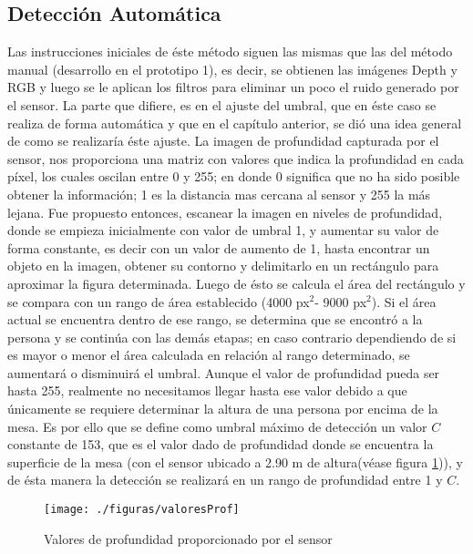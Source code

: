 \documentclass[a4paper,openright,12pt]{report}
\begin{document}
\subsection{Detección Automática}
Las instrucciones iniciales de éste método siguen las mismas que las del método manual (desarrollo en el prototipo 1), es decir, se obtienen las imágenes Depth y RGB y luego se le aplican los filtros para eliminar un poco el ruido generado por el sensor. La parte que difiere, es en el ajuste del umbral, que en éste caso se realiza de forma automática y que en el capítulo anterior, se dió una idea general de como se realizaría éste ajuste. La imagen de profundidad capturada por el sensor, nos proporciona una matriz con valores que indica la profundidad en cada píxel, los cuales oscilan entre 0 y 255; en donde 0 significa que no ha sido posible obtener la información; 1 es la distancia mas cercana al sensor y 255 la más lejana. Fue propuesto entonces, escanear la imagen en niveles de profundidad, donde se empieza inicialmente con valor de umbral 1, y aumentar su valor de forma constante, es decir con un valor de aumento de 1, hasta encontrar un objeto en la imagen, obtener su contorno y delimitarlo en un rectángulo para aproximar la figura determinada. Luego de ésto se calcula el área del rectángulo y se compara con un rango de área establecido (4000 px$^2$- 9000 px$^2$). Si el área actual se encuentra dentro de ese rango, se determina que se encontró a la persona y se continúa con las demás etapas; en caso contrario dependiendo de si es mayor o menor el área calculada en relación al rango determinado, se aumentará o disminuirá el umbral. Aunque el valor de profundidad pueda ser hasta 255, realmente no necesitamos llegar hasta ese valor debido a que únicamente se requiere determinar la altura de una persona por encima de la mesa. Es por ello que se define como umbral máximo de detección un valor $C$ constante de 153, que es el valor dado de profundidad donde se encuentra la superficie de la mesa (con el sensor ubicado a 2.90 m de altura(véase figura \ref{fig:valorProf})), y de ésta manera la detección se realizará en un rango de profundidad entre 1 y $C$. \begin{figure}[H]
	\centering
	\texttt{[image: ./figuras/valoresProf]}
	\caption{Valores de profundidad proporcionado por el sensor} 
	\label{fig:valorProf}

\end{figure}
\end{document}
